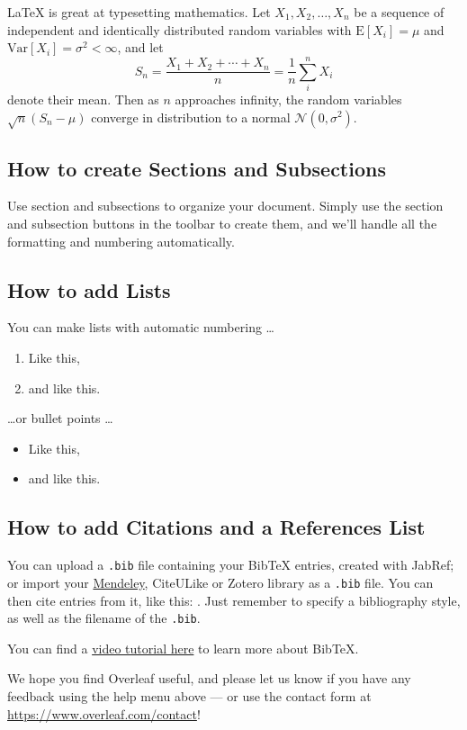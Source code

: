 \LaTeX{} is great at typesetting mathematics. Let $X_1, X_2, \ldots, X_n$ be a sequence of independent and identically distributed random variables with $\text{E}[X_i] = \mu$ and $\text{Var}[X_i] = \sigma^2 < \infty$, and let
\[S_n = \frac{X_1 + X_2 + \cdots + X_n}{n}
      = \frac{1}{n}\sum_{i}^{n} X_i\]
denote their mean. Then as $n$ approaches infinity, the random variables $\sqrt{n}(S_n - \mu)$ converge in distribution to a normal $\mathcal{N}(0, \sigma^2)$.


\subsection{How to create Sections and Subsections}

Use section and subsections to organize your document. Simply use the section and subsection buttons in the toolbar to create them, and we'll handle all the formatting and numbering automatically.

\subsection{How to add Lists}

You can make lists with automatic numbering \dots

\begin{enumerate}
\item Like this,
\item and like this.
\end{enumerate}
\dots or bullet points \dots
\begin{itemize}
\item Like this,
\item and like this.
\end{itemize}

\subsection{How to add Citations and a References List}

You can upload a \verb|.bib| file containing your BibTeX entries, created with JabRef; or import your \href{https://www.overleaf.com/blog/184}{Mendeley}, CiteULike or Zotero library as a \verb|.bib| file. You can then cite entries from it, like this: \cite{greenwade93}. Just remember to specify a bibliography style, as well as the filename of the \verb|.bib|.

You can find a \href{https://www.overleaf.com/help/97-how-to-include-a-bibliography-using-bibtex}{video tutorial here} to learn more about BibTeX.

We hope you find Overleaf useful, and please let us know if you have any feedback using the help menu above --- or use the contact form at \url{https://www.overleaf.com/contact}!